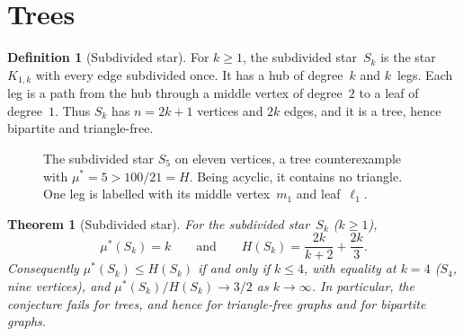 \documentclass[11pt]{article}
\newtheorem{theorem}{Theorem}
\theoremstyle{definition}
\newtheorem{definition}{Definition}
\theoremstyle{remark}
\newcommand{\mustar}{\mu^{*}}
\begin{document}
\section{Trees}\label{sec:trees}

\begin{definition}[Subdivided star]\label{def:Sk}
For $k \ge 1$, the subdivided star~$S_k$ is the star $K_{1,k}$ with every
edge subdivided once.  It has a hub of degree~$k$ and $k$~legs.  Each leg is
a path from the hub through a middle vertex of degree~$2$ to a leaf of
degree~$1$.  Thus $S_k$ has $n = 2k+1$ vertices and $2k$ edges, and it is a
tree, hence bipartite and triangle-free.
\end{definition}

\begin{figure}[ht]
\centering
{}
\caption{The subdivided star $S_5$ on eleven vertices, a tree counterexample
with $\mustar = 5 > 100/21 = H$.  Being acyclic, it contains no triangle.  One leg
is labelled with its middle vertex~$m_1$ and leaf~$\ell_1$.}
\label{fig:star}
\end{figure}

\begin{theorem}[Subdivided star]\label{thm:tree}
For the subdivided star~$S_k$ ($k \ge 1$),
\[
  \mustar(S_k) = k
  \qquad\text{and}\qquad
  H(S_k) = \frac{2k}{k+2} + \frac{2k}{3}.
\]
Consequently $\mustar(S_k) \le H(S_k)$ if and only if $k \le 4$, with
equality at $k = 4$ ($S_4$, nine vertices), and
$\mustar(S_k)/H(S_k) \to 3/2$ as $k \to \infty$.  In particular, the
conjecture fails for trees, and hence for triangle-free graphs and for
bipartite graphs.
\end{theorem}
\end{document}
